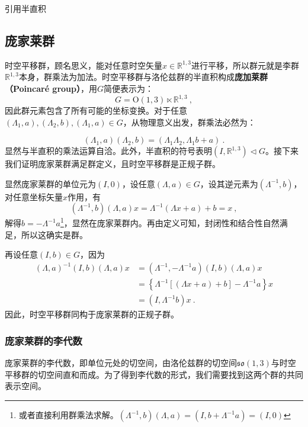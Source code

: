 

\begin{issues}
\issueTODO 引用半直积
\end{issues}


\subsection{庞家莱群}
时空平移群，顾名思义，能对任意时空矢量$x\in \mathbb R^{1,3} $进行平移，所以群元就是李群$\mathbb R^{1,3}$本身，群乘法为加法。时空平移群与洛伦兹群的半直积构成\textbf{庞加莱群（Poincaré group）}，用$G$简便表示为：
\begin{equation}
G= \mathrm{O}(1,3) \ltimes\mathbb{R}^{1,3}~,
\end{equation}
因此群元素包含了所有可能的坐标变换。对于任意$(\Lambda_1,a),(\Lambda_2,b),(\Lambda_1,a)\in G$，从物理意义出发，群乘法必然为：

\begin{equation}
(\Lambda_1,a)(\Lambda_2,b)=(\Lambda_1\Lambda_2,\Lambda_1b+a)~.
\end{equation}
显然与半直积的乘法运算自洽。此外，半直积的符号表明$(I,\mathbb R^{1,3})\vartriangleleft G$。接下来我们证明庞家莱群满足群定义，且时空平移群是正规子群。

显然庞家莱群的单位元为$(I,0)$，设任意$(\Lambda,a)\in G$，设其逆元素为$(\Lambda^{-1},b)$，对任意坐标矢量$x$作用，有
\begin{equation}
(\Lambda^{-1},b)(\Lambda,a)x=\Lambda^{-1}(\Lambda x+a)+b=x~,
\end{equation}
解得$b=-\Lambda^{-1} a$\footnote{或者直接利用群乘法求解。$(\Lambda^{-1},b)(\Lambda,a)=(I,b+\Lambda^{-1}a)=(I,0)$}，显然在庞家莱群内。再由定义可知，封闭性和结合性自然满足，所以这确实是群。

再设任意$(I,b)\in G$，因为
\begin{equation}
\begin{aligned}
(\Lambda,a)^{-1}(I,b)(\Lambda,a)x&=(\Lambda^{-1},-\Lambda^{-1}a)(I,b)(\Lambda,a)x\\
&=\left\{\Lambda^{-1}\left [\left(\Lambda x+a \right)+b\right]-\Lambda^{-1}a\right\}x\\
&=(I,\Lambda^{-1}b)x~.
\end{aligned}
\end{equation}
因此，时空平移群同构于庞家莱群的正规子群。



\subsubsection{庞家莱群的李代数}
庞家莱群的李代数，即单位元处的切空间，由洛伦兹群的切空间$\mathfrak {so}(1,3)$与时空平移群的切空间直和而成。为了得到李代数的形式，我们需要找到这两个群的共同表示空间。

